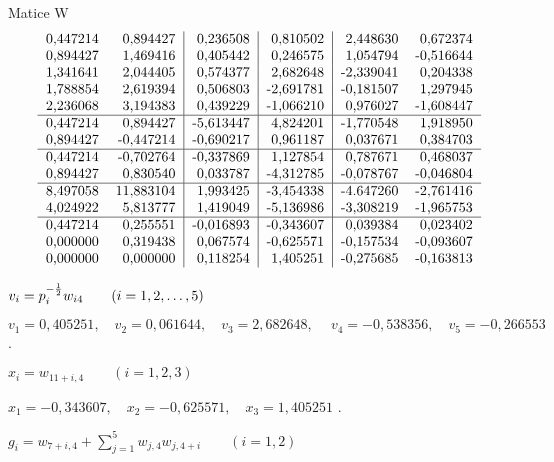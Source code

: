 \begin{Example}{Matice W}
\begin{align*}
\begin{tabular}{rr|r|r|rr}
  0,447214 &  0,894427 &  0,236508 &  0,810502 &  2,448630 &  0,672374 \\
  0,894427 &  1,469416 &  0,405442 &  0,246575 &  1,054794 & -0,516644 \\
  1,341641 &  2,044405 &  0,574377 &  2,682648 & -2,339041 &  0,204338 \\
  1,788854 &  2,619394 &  0,506803 & -2,691781 & -0,181507 &  1,297945 \\
  2,236068 &  3,194383 &  0,439229 & -1,066210 &  0,976027 & -1,608447 \\
  \hline
  0,447214 &  0,894427 & -5,613447 &  4,824201 & -1,770548 &  1,918950 \\
  0,894427 & -0,447214 & -0,690217 &  0,961187 &  0,037671 &  0,384703 \\
  \hline
  0,447214 & -0,702764 & -0,337869 &  1,127854 &  0,787671 &  0,468037 \\
  0,894427 &  0,830540 &  0,033787 & -4,312785 & -0,078767 & -0,046804 \\
  \hline
  8,497058 & 11,883104 &  1,993425 & -3,454338 & -4.647260 & -2,761416 \\
  4,024922 &  5,813777 &  1,419049 & -5,136986 & -3,308219 & -1,965753 \\
  \hline
  0,447214 &  0,255551 & -0,016893 & -0,343607 &  0,039384 &  0,023402 \\
  0,000000 &  0,319438 &  0,067574 & -0,625571 & -0,157534 & -0,093607 \\
  0,000000 &  0,000000 &  0,118254 &  1,405251 & -0,275685 & -0,163813 \\
\end{tabular}
\end{align*}
\end{Example}


%
$v_i = p_i^{-{1\over2}}w_{i4}\qquad(i=1,2,\ldots,5)$

\smallskip
 $v_1 = 0,405251, \quad v_2 = 0,061644, \quad v_3 = 2,682648,\
 \quad v_4 = -0,538356,\quad v_5 =-0,266553$ .

%
$x_i = w_{11+i,4} \qquad(i=1,2,3)$

\smallskip
        $x_1=-0,343607,  \quad x_2=-0,625571, \quad x_3=1,405251$ .

%
$g_i = w_{7+i,4} + \sum_{j=1}^5 w_{j,4} w_{j,4+i} \qquad (i=1,2)$

